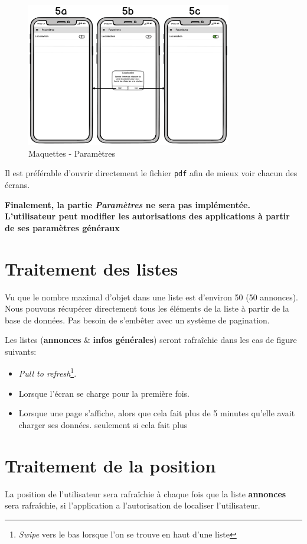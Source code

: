 \documentclass[french]{report}
\begin{document}
\begin{figure}[H]
    \centering
    \includegraphics[width=0.8\textwidth]{../mocks/5.pdf}
    \caption{Maquettes - Paramètres}
    \label{fig:mockups_partners}
\end{figure}

Il est préférable d'ouvrir directement le fichier \verb|pdf| afin de mieux voir
chacun des écrans.

\textbf{Finalement, la partie \textit{Paramètres} ne sera pas implémentée. L'utilisateur
peut modifier les autorisations des applications à partir de ses paramètres généraux}

\section{Traitement des listes}
Vu que le nombre maximal d'objet dans une liste est d'environ 50 (50 annonces).
Nous pouvons récupérer directement tous les éléments de la liste à partir de la base
de données. Pas besoin de s'embêter avec un système de pagination.

Les listes (\textbf{annonces} \& \textbf{infos générales}) seront rafraîchie dans 
les cas de figure suivants:
\begin{itemize}
    \item \textit{Pull to refresh}\footnote{\textit{Swipe} vers le bas lorsque l'on
    se trouve en haut d'une liste}.
    \item Lorsque l'écran se charge pour la première fois.
    \item Lorsque une page s'affiche, alors que cela fait plus de 5 minutes qu'elle
    avait charger ses données.
    seulement si cela fait plus 
\end{itemize}

\section{Traitement de la position}
La position de l'utilisateur sera rafraîchie à chaque fois que la liste \textbf{annonces}
sera rafraîchie, si l'application a l'autorisation de localiser l'utilisateur.
\end{document}
